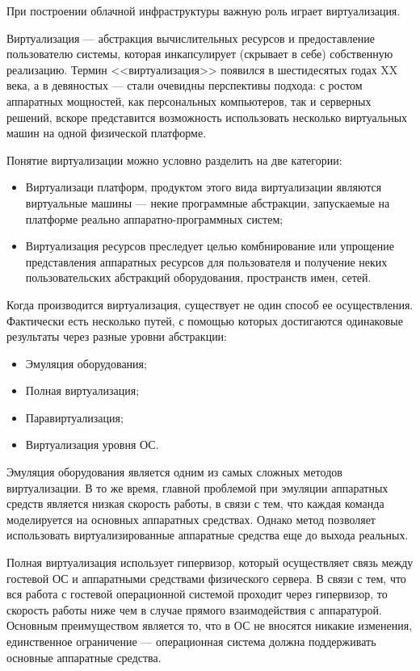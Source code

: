 При построении облачной инфраструктуры важную роль играет виртуализация.

Виртуализация --- абстракция вычислительных ресурсов и предоставление пользователю системы, которая инкапсулирует (скрывает в себе) собственную реализацию.
Термин <<виртуализация>> появился в шестидесятых годах XX века, а в девяностых --- стали очевидны перспективы подхода: с ростом аппаратных мощностей, как персональных компьютеров, так и серверных решений, вскоре представится возможность использовать несколько виртуальных машин на одной физической платформе.

Понятие виртуализации можно условно разделить на две категории:
\begin{itemize}
  \item Виртуализаци платформ, продуктом этого вида виртуализации являются виртуальные машины --- некие программные абстракции, запускаемые на платформе реально аппаратно-программных систем;
  \item Виртуализация ресурсов преследует целью комбнирование или упрощение представления аппаратных ресурсов для пользователя и получение неких пользовательских абстракций оборудования, пространств имен, сетей.
\end{itemize}

Когда производится виртуализация, существует не один способ ее осуществления.
Фактически есть несколько путей, с помощью которых достигаются одинаковые результаты через разные уровни абстракции: \cite{openvz-tutorial}
\begin{itemize}
  \item Эмуляция оборудования;
  \item Полная виртуализация;
  \item Паравиртуализация;
  \item Виртуализация уровня ОС.
\end{itemize}

Эмуляция оборудования является одним из самых сложных методов виртуализации.
В то же время, главной проблемой при эмуляции аппаратных средств является низкая скорость работы, в связи с тем, что каждая команда моделируется на основных аппаратных средствах. 
Однако метод позволяет использовать виртуализированные аппаратные средства еще до выхода реальных.

Полная виртуализация использует гипервизор, который осуществляет связь между гостевой ОС и аппаратными средствами физического сервера.
В связи с тем, что вся работа с гостевой операционной системой проходит через гипервизор, то скорость работы ниже чем в случае прямого взаимодействия с аппаратурой.
Основным преимуществом является то, что в ОС не вносятся никакие изменения, единственное ограничение --- операционная система должна поддерживать основные аппаратные средства.

